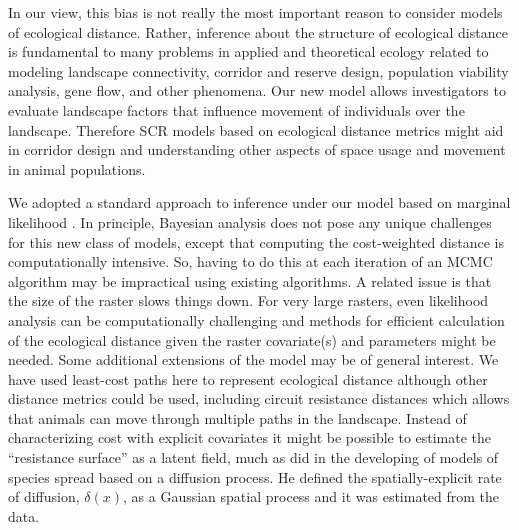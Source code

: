 \documentclass[12pt]{article}
\begin{document}
In our view, this bias is not really the most important reason to consider models of
ecological distance. Rather, inference about the structure of
ecological distance is fundamental to many problems in applied and
theoretical ecology related to modeling landscape
connectivity, corridor and reserve design, population viability
analysis, gene flow, and other phenomena.
Our new model
allows investigators to  evaluate landscape
factors that influence movement of individuals over the landscape. 
Therefore SCR models based on ecological distance metrics might aid in
corridor design and understanding other aspects of space usage and
movement in animal populations.

We adopted a standard approach to inference under our model based on
marginal likelihood \citep{borchers_efford:2008}. In principle,
Bayesian analysis does not pose any unique challenges for this new
class of models, except that computing the cost-weighted distance is
computationally intensive.
 So, having to do this at each iteration of an
MCMC algorithm may be impractical using existing algorithms.
A related issue is that the size of the raster slows things down. For
very large rasters, even likelihood analysis can be computationally
challenging and methods for efficient calculation of the ecological distance
given the raster covariate(s) and parameters might be needed.
Some additional extensions of the model may be of general
interest. 
We have used least-cost paths here to represent ecological distance although
other distance metrics could be used, including circuit resistance distances
\citep{mcrae_beier:2007} which allows that animals can move through multiple paths 
in the landscape.
Instead of characterizing cost with 
explicit covariates it might be possible to estimate the
``resistance surface'' as a latent field, much as \citep{wikle:2003}
 did in the developing of models of species spread based on a
 diffusion process. He defined the spatially-explicit rate of
diffusion, $\delta(x)$, as a Gaussian spatial process and it was
estimated from the data.  













\newpage



\newpage

\end{document}
